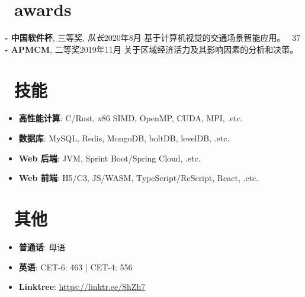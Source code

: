 \documentclass{common}
\begin{document}
\section{\faTrophy\ awards}
\award
    {\textbf{- 中国软件杯}, 三等奖, \textit{队长}}{2020年8月}
    {基于计算机视觉的交通场景智能应用。 
        {\href{https://github.com/Sh-Zh-7/intelligent-transportation-system}{\underline{\faGithub}} \faStarO\ 37}
    }
\award
    {\textbf{- APMCM}, 二等奖}{2019年11月}
    {关于区域经济活力及其影响因素的分析和决策。}

\section{\faCogs\ 技能}
\begin{itemize}[parsep=0.5ex]
    \item \textbf{高性能计算}: C/Rust, x86 SIMD, OpenMP, CUDA, MPI, .etc.
    \item \textbf{数据库}: MySQL, Redis, MongoDB, boltDB, levelDB, .etc.
    \item \textbf{Web 后端}: JVM, Sprint Boot/Spring Cloud, .etc.
    \item \textbf{Web 前端}: H5/C3, JS/WASM, TypeScript/ReScript, React, .etc.
\end{itemize}

\section{\faInfo\ 其他}
\begin{itemize}[parsep=0.5ex]
    \item \textbf{普通话}: 母语
    \item \textbf{英语}: CET-6: 463 | CET-4: 556
    \item \textbf{Linktree}: \href{https://linktr.ee/ShZh7}{\underline{https://linktr.ee/ShZh7}}
\end{itemize}
\end{document}
